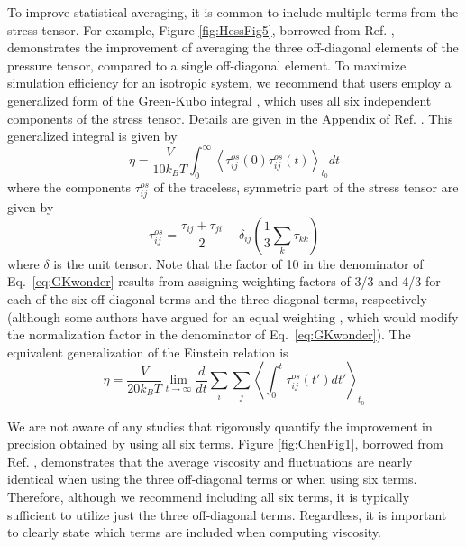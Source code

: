 \documentclass[9pt,bestpractices]{livecoms}
\begin{document}
To improve statistical averaging, it is common to include multiple terms from the stress tensor. For example, Figure \ref{fig:HessFig5}, borrowed from Ref. \cite{Hess2002}, demonstrates the improvement of averaging the three off-diagonal elements of the pressure tensor, compared to a single off-diagonal element. To maximize simulation efficiency for an isotropic system, we recommend that users employ a generalized form of the Green-Kubo integral \citep{Evans:90, Daivis:1994}, which uses all six independent components of the stress tensor. Details are given in the Appendix of Ref. \cite{Daivis:1994}. This generalized integral is given by
\begin{equation}
  \eta = \frac{V}{10 k_B T}  \int_0^\infty \left\langle \tau_{ij}^{os}(0)\tau_{ij}^{os}(t) \right\rangle_{t_0} dt
  \label{eq:GKwonder}
\end{equation}
where the components $\tau_{ij}^{os}$ of the traceless, symmetric part of the stress tensor are given by
\begin{equation}
  \tau_{ij}^{os} = \frac{\tau_{ij}+\tau_{ji}}{2} - \delta_{ij} \left( \frac{1}{3} \sum_k \tau_{kk} \right)
  \label{eq:Pwonder}
\end{equation}
where $\delta$ is the unit tensor. Note that the factor of 10 in the denominator of Eq.~\ref{eq:GKwonder} results from assigning weighting factors of 3/3 and 4/3 for each of the six off-diagonal terms and the three diagonal terms, respectively \cite{Liu2012,Borodin2009,Mondello1997} (although some authors have argued for an equal weighting \cite{Chen2009}, which would modify the normalization factor in the denominator of Eq.~\ref{eq:GKwonder}).
The equivalent generalization of the Einstein relation is
\begin{equation}
  \eta = \frac{V}{20 k_B T} \lim_{t\to\infty} \frac{d}{dt} \sum_i \sum_j \left\langle \int_0^t \tau_{ij}^{os}(t') dt' \right\rangle_{t_0}
  \label{eq:Einwonder}
\end{equation}

We are not aware of any studies that rigorously quantify the improvement in precision obtained by using all six terms. Figure \ref{fig:ChenFig1}, borrowed from Ref. \cite{Chen2009}, demonstrates that the average viscosity and fluctuations are nearly identical when using the three off-diagonal terms or when using six terms. Therefore, although we recommend including all six terms, it is typically sufficient to utilize just the three off-diagonal terms. Regardless, it is important to clearly state which terms are included when computing viscosity.
\end{document}
